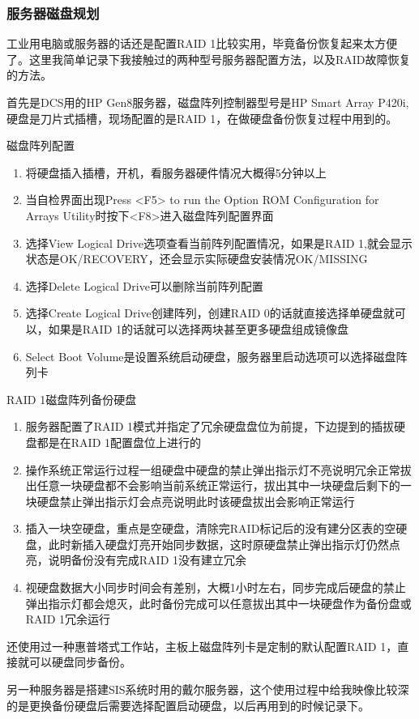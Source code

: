\subsubsection{服务器磁盘规划}
工业用电脑或服务器的话还是配置RAID 1比较实用，毕竟备份恢复起来太方便了。这里我简单记录下我接触过的两种型号服务器配置方法，以及RAID故障恢复的方法。

首先是DCS用的HP Gen8服务器，磁盘阵列控制器型号是HP Smart Array P420i,硬盘是刀片式插槽，现场配置的是RAID 1，在做硬盘备份恢复过程中用到的。

磁盘阵列配置
\begin{enumerate}
	\item 将硬盘插入插槽，开机，看服务器硬件情况大概得5分钟以上
	\item 当自检界面出现Press <F5> to run the Option ROM Configuration for Arrays Utility时按下<F8>进入磁盘阵列配置界面
	\item 选择View Logical Drive选项查看当前阵列配置情况，如果是RAID 1,就会显示状态是OK/RECOVERY，还会显示实际硬盘安装情况OK/MISSING
	\item 选择Delete Logical Drive可以删除当前阵列配置
	\item 选择Create Logical Drive创建阵列，创建RAID 0的话就直接选择单硬盘就可以，如果是RAID 1的话就可以选择两块甚至更多硬盘组成镜像盘
	\item Select Boot Volume是设置系统启动硬盘，服务器里启动选项可以选择磁盘阵列卡
\end{enumerate}
RAID 1磁盘阵列备份硬盘
\begin{enumerate}
	\item 服务器配置了RAID 1模式并指定了冗余硬盘盘位为前提，下边提到的插拔硬盘都是在RAID 1配置盘位上进行的
	\item 操作系统正常运行过程一组硬盘中硬盘的禁止弹出指示灯不亮说明冗余正常拔出任意一块硬盘都不会影响当前系统正常运行，拔出其中一块硬盘后剩下的一块硬盘禁止弹出指示灯会点亮说明此时该硬盘拔出会影响正常运行
	\item 插入一块空硬盘，重点是空硬盘，清除完RAID标记后的没有建分区表的空硬盘，此时新插入硬盘灯亮开始同步数据，这时原硬盘禁止弹出指示灯仍然点亮，说明备份没有完成RAID 1没有建立冗余
	\item 视硬盘数据大小同步时间会有差别，大概1小时左右，同步完成后硬盘的禁止弹出指示灯都会熄灭，此时备份完成可以任意拔出其中一块硬盘作为备份盘或RAID 1冗余运行
\end{enumerate}
还使用过一种惠普塔式工作站，主板上磁盘阵列卡是定制的默认配置RAID 1，直接就可以硬盘同步备份。

另一种服务器是搭建SIS系统时用的戴尔服务器，这个使用过程中给我映像比较深的是更换备份硬盘后需要选择配置启动硬盘，以后再用到的时候记录下。



